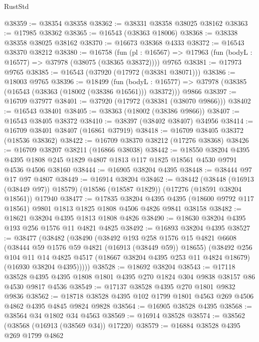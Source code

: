 \begin{lexlean}{RustStd}
\begin{coremodule}
@38359 := @38354 @38358
@38362 := @38331 @38358 @38025 @38162
@38363 := @17985 @38362
@38365 := @16543 (@38363 @18006)
@38368 := @38338 @38358 @38025 @38162
@38370 := @16673 @38368 @4333
@38372 := @16543 @38370 @38212
@38380 := @16758
    (fun (pl : @16567) => @17963 (fun (bodyL : @16577) => @37978 (@38075 (@38365 @38372))))
    @9765
@38381 := @17973 @9765
@38385 := @16543 (@37920 (@17972 (@38381 @38071)))
@38386 := @18003 @9765
@38396 := @18499
    (fun (bodyL : @16577) => @37978 (@38385 (@16543 (@38363 (@18002 (@38386 @16561))) @38372)))
    @9866
@38397 := @16709 @37977
@38401 := @37920 (@17972 (@38381 (@38070 @9866)))
@38402 := @16543 @38401
@38405 := @38363 (@18002 (@38386 @9866))
@38407 := @16543 @38405 @38372
@38410 := @38397 (@38402 @38407) @34956
@38414 := @16709 @38401 @38407 (@16861 @37919)
@38418 := @16709 @38405 @38372 (@18536 @38362)
@38422 := @16709 @38370 @38212 (@17276 @38368)
@38426 := @16709 @38207 @38211 (@16866 @38038)
@38442 := @18550
    @38204
    @4395
    @4395
    @1808
    @245
    @1829
    @4807
    @1813
    @117
    @1825
    @18561
    @4530
    @9791
    @4536
    @4506
    @38160
@38444 := @16905 @38204 @4395
@38448 := @38444 @97 @17 @97 @4807
@38449 := @16914 @38204
@38462 := @38442
    (@38448 (@16913 (@38449 @97)) @18579)
    (@18586 (@18587 @1829))
    (@17276 (@18591 @38204 @18561))
    @17940
@38477 := @17835
    @38204
    @4395
    @4395
    (@18600 @9792 @117 @18561)
    @9801
    @1813
    @1825
    @1808
    @4506
    @4826
    @9841
    @38158
@38482 := @18621 @38204 @4395 @1813 @1808 @4826
@38490 := @18630 @38204 @4395 @193 @256 @1576 @11 @4821 @4825
@38492 := @16893 @38204 @4395
@38527 := @38477
    (@38482
      (@38490
        (@38492
          @193
          @258
          @1576
          @15
          @4821
          @6608
          (@38444 @59 @1576 @59 @4821 (@16913 (@38449 @59)) @18655)
          (@38492
            @256
            @104
            @11
            @14
            @4825
            @4517
            (@18667 @38204 @4395 @253 @11 @4824 @18679)
            (@16930 @38204 @4395)))))
@38528 := @18692 @38204
@38543 := @17118
    @38528
    @4395
    @4395
    @1808
    @1801
    @4395
    @270
    @1824
    @304
    @9838
    @38157
    @86
    @4530
    @9817
    @4536
@38549 := @17137 @38528 @4395 @270 @1801 @9832 @9836
@38562 := @18718 @38528 @4395 @102 @1799 @1801 @4563 @269 @4506 @4862 @4395 @4845 @9824 @9828
@38564 := @16905 @38528 @4395
@38568 := @38564 @34 @1802 @34 @4563
@38569 := @16914 @38528
@38574 := @38562 (@38568 (@16913 (@38569 @34)) @17220)
@38579 := @16884 @38528 @4395 @269 @1799 @4862

\end{coremodule}
\end{lexlean}
